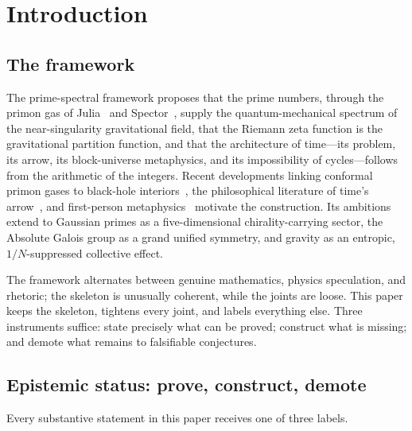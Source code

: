 \documentclass[11pt,a4paper]{article}
\theoremstyle{plain}
\theoremstyle{definition}
\theoremstyle{remark}
\begin{document}
\bigskip

\section{Introduction}\label{sec:intro}

\subsection{The framework}

The prime-spectral framework proposes that the prime numbers, through the primon gas of
Julia~\cite{julia1990} and Spector~\cite{spector1998}, supply the quantum-mechanical spectrum
of the near-singularity gravitational field, that the Riemann zeta function is the gravitational
partition function, and that the architecture of time---its problem, its arrow, its
block-universe metaphysics, and its impossibility of cycles---follows from the arithmetic of the
integers. Recent developments linking conformal primon gases to black-hole
interiors~\cite{hartnollyang2026}, the philosophical literature of time's
arrow~\cite{carroll2010,wallace2017,price1996}, and first-person
metaphysics~\cite{hellie2013,hare2009,conitzer2019} motivate the construction. Its ambitions
extend to Gaussian primes as a five-dimensional chirality-carrying sector, the Absolute Galois
group as a grand unified symmetry, and gravity as an entropic, $1/N$-suppressed collective
effect.

The framework alternates between genuine mathematics, physics speculation, and rhetoric; the
skeleton is unusually coherent, while the joints are loose. This paper keeps the skeleton,
tightens every joint, and labels everything else. Three instruments suffice: state precisely
what can be proved; construct what is missing; and demote what remains to falsifiable
conjectures.

\subsection{Epistemic status: prove, construct, demote}\label{sec:method}

Every substantive statement in this paper receives one of three labels.
\end{document}

